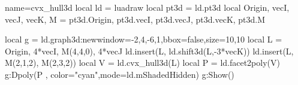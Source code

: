 \begin{luadraw}{name=cvx_hull3d}
local ld = luadraw
local pt3d = ld.pt3d
local Origin, vecI, vecJ, vecK, M = pt3d.Origin, pt3d.vecI, pt3d.vecJ, pt3d.vecK, pt3d.M

local g = ld.graph3d:new{window={-2,4,-6,1},bbox=false,size={10,10}}
local L = {Origin, 4*vecI, M(4,4,0), 4*vecJ}
ld.insert(L, ld.shift3d(L,-3*vecK))
ld.insert(L, {M(2,1,2), M(2,3,2)})
local V = ld.cvx_hull3d(L)
local P = ld.facet2poly(V)
g:Dpoly(P , {color="cyan",mode=ld.mShadedHidden})
g:Show()
\end{luadraw}

